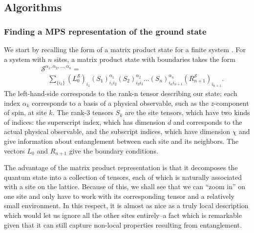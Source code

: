 \documentclass[12pt]{amsbook}
\theoremstyle{plain}
\theoremstyle{definition}
\theoremstyle{remark}
\newcommand{\paren}[1]{\left(#1\right)}
\begin{document}
\subsection{Algorithms}
\label{algorithms}
\subsubsection{Finding a MPS representation of the ground state}
\label{main-algorithm}

We start by recalling the form of a matrix product state for a finite system \cite{Schollwock:2005ul}.  For a system with $n$ sites, a matrix product state with boundaries takes the form  \begin{eqnarray}
&&\mathcal{S}^{\alpha_1,\alpha_2,\dots,\alpha_n} = \nonumber \\
&&\quad\sum_{\{i_k\}} \paren{L^{\mathcal{S}}_0}_{i_1}\paren{S_1}^{\alpha_1}_{i_1 i_2} \paren{S_2}^{\alpha_2}_{i_2i_3}\dots \paren{S_n}^{\alpha_n}_{i_n i_{n+1}} \paren{R^{\mathcal{S}}_{n+1}}_{i_{n+1}}. \nonumber
\end{eqnarray}  The left-hand-side corresponds to the rank-n tensor describing our state;  each index $\alpha_k$ corresponds to a basis of a physical observable, such as the $z$-component of spin, at site $k$.  The rank-3 tensors $S_k$ are the site tensors, which have two kinds of indices:  the superscript index, which has dimension $d$ and corresponds to the actual physical observable, and the subscript indices, which have dimension $\chi$ and give information about entanglement between each site and its neighbors.  The vectors $L_0$ and $R_{n+1}$ give the boundary conditions.

The advantage of the matrix product representation is that it decomposes the quantum state into a collection of tensors, each of which is naturally associated with a site on the lattice.  Because of this, we shall see that we can ``zoom in'' on one site and only have to work with its corresponding tensor and a relatively small environment.  In this respect, it is almost as nice as a truly local description which would let us ignore all the other sites entirely--a fact which is remarkable given that it can still capture non-local properties resulting from entanglement.
\end{document}
